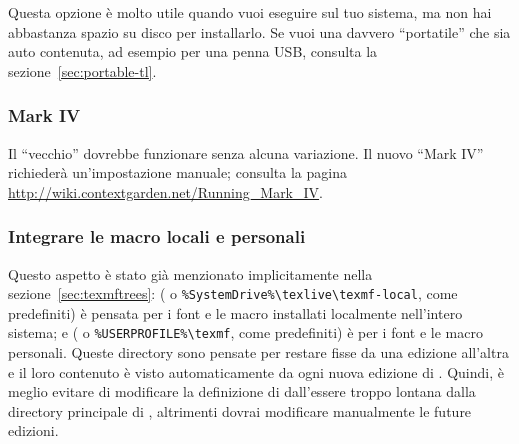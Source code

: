 \documentclass{article}
\begin{document}
Questa opzione è molto utile quando vuoi eseguire \TL{} sul tuo sistema,
ma non hai abbastanza spazio su disco per installarlo. Se vuoi una \TL{}
davvero ``portatile'' che sia auto contenuta, ad esempio per una penna
USB, consulta la sezione~\ref{sec:portable-tl}.

\subsubsection{\ConTeXt{} Mark IV}

Il ``vecchio'' \ConTeXt{} dovrebbe funzionare senza alcuna variazione. Il
nuovo \ConTeXt{} ``Mark IV'' richiederà un'impostazione manuale; consulta
la pagina \url{http://wiki.contextgarden.net/Running_Mark_IV}.


\subsubsection{Integrare le macro locali e personali}
\label{sec:local-personal-macros}

Questo aspetto è stato già menzionato implicitamente nella
sezione~\ref{sec:texmftrees}: 
( o
\verb|%SystemDrive%\texlive\texmf-local|, come predefiniti) è pensata per
i font e le macro installati localmente nell'intero sistema; e
 ( o \verb|%USERPROFILE%\texmf|,
come predefiniti) è per i font e le macro personali. Queste directory sono
pensate per restare fisse da una edizione all'altra e il loro contenuto è
visto automaticamente da ogni nuova edizione di \TL{}. Quindi, è meglio
evitare di modificare la definizione di  dall'essere
troppo lontana dalla directory principale di \TL{}, altrimenti dovrai
modificare manualmente le future edizioni. %
\end{document}

